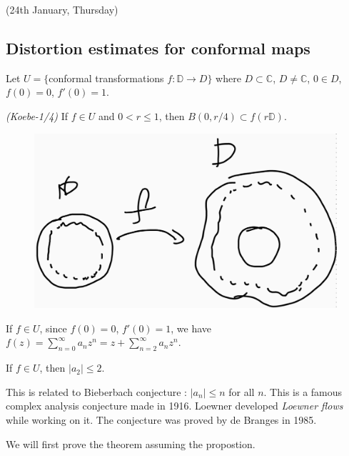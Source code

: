 \documentclass[12pt,a4paper]{article}
\begin{document}
\newday

(24th January, Thursday)
\s

\subsection*{Distortion estimates for conformal maps}

Let $U = \{$conformal transformations $f: \mathbb{D} \rightarrow D \}$ where $D\subset \mathbb{C}$, $D\neq \mathbb{C}$, $0\in D$, $f(0)=0$, $f'(0)=1$.
\s

\thm \emph{(Koebe-1/4)} If $f\in U$ and $0<r\leq 1$, then $B(0, r/4)\subset f(r\mathbb{D})$.

\begin{figure}[h]
\begin{center}
    \includegraphics[scale =0.15]{3}
\end{center}
\end{figure}
\s

If $f\in U$, since $f(0) =0$, $f'(0)=1$, we have $f(z) = \sum_{n=0}^{\infty} a_n z^n = z+ \sum_{n=2}^{\infty} a_n z^n$.
\s

 If $f\in U$, then $|a_2|\leq 2$.
\s

This is related to Bieberbach conjecture : $|a_n|\leq n$ for all $n$. This is a famous complex analysis conjecture made in 1916. Loewner developed \emph{Loewner flows} while working on it. The conjecture was proved by de Branges in 1985.
\s

We will first prove the theorem assuming the propostion.
\end{document}
